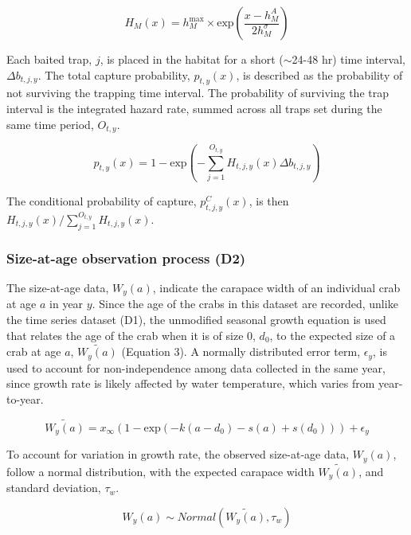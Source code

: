 \documentclass{article}
\begin{document}
\begin{equation}
H_M(x) = h^{\text{max}}_M \times \text{exp}(\frac{x-h^{A}_M}{2 h^{\sigma}_M})
\end{equation}

Each baited trap, $j$, is placed in the habitat for a short ($\sim$24-48 hr) time interval, $\Delta b_{t,j,y}$. The total capture probability, $p_{t,y}(x)$, is described as the probability of not surviving the trapping time interval. The probability of surviving the trap interval is the integrated hazard rate, summed across all traps set during the same time period, $O_{t,y}$.

\begin{equation}
p_{t,y}(x) = 1-\text{exp}\left(-\sum_{j=1}^{O_{t,y}} H_{t,j,y}(x)\Delta b_{t,j,y}\right)
\end{equation}

The conditional probability of capture, $p^C_{t,j,y}(x)$, is then $H_{t,j,y}(x)/\sum_{j=1}^{O_{t,y}}H_{t,j,y}(x)$.

\subsubsection*{Size-at-age observation process (D2)}

The size-at-age data, $W_y(a)$, indicate the carapace width of an individual crab at age $a$ in year $y$. Since the age of the crabs in this dataset are recorded, unlike the time series dataset (D1), the unmodified seasonal growth equation is used that relates the age of the crab when it is of size 0, $d_0$, to the expected size of a crab at age $a$, $\widetilde{W_y(a)}$ (Equation 3). A normally distributed error term, $\epsilon_y$, is used to account for non-independence among data collected in the same year, since growth rate is likely affected by water temperature, which varies from year-to-year.

\begin{equation}
\widetilde{W_y(a)} = x_{\infty}(1-\text{exp}(-k(a-d_0) - s(a) + s(d_0))) + \epsilon_y
\end{equation}

To account for variation in growth rate, the observed size-at-age data, $W_y(a)$, follow a normal distribution, with the expected carapace width $\widetilde{W_y(a)}$, and standard deviation, $\tau_{w}$.

\begin{equation}
W_y(a) \sim Normal(\widetilde{W_y(a)}, \tau_{w})
\end{equation}
\end{document}
